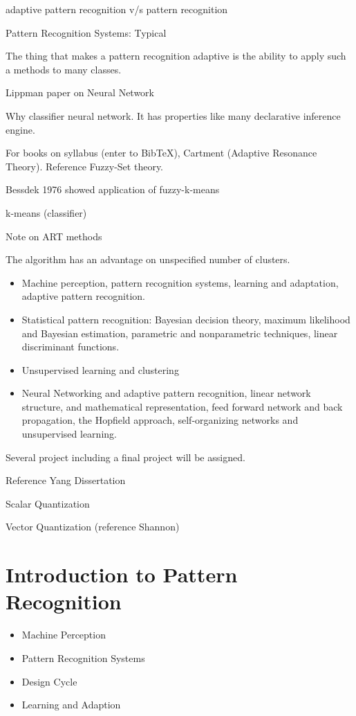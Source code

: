 adaptive pattern recognition
v/s 
pattern recognition

Pattern Recognition Systems:  Typical


The thing that makes a pattern recognition adaptive is the ability to apply such a methods to many classes.  

Lippman paper on Neural Network 

Why classifier neural network.  It has properties like many declarative inference engine.  

For books on syllabus (enter to BibTeX), Cartment  (Adaptive Resonance Theory).  Reference Fuzzy-Set theory.  


Bessdek 1976 showed application of fuzzy-k-means 


k-means (classifier)

Note on ART methods 

The algorithm has an advantage on unspecified number of clusters.  

\begin{itemize}
	\item Machine perception, pattern recognition systems, learning and adaptation, adaptive pattern recognition.
	\item Statistical pattern recognition: Bayesian decision theory, maximum likelihood and Bayesian estimation, parametric and nonparametric techniques, linear discriminant functions.  
	\item Unsupervised learning and clustering
	\item Neural Networking and adaptive pattern recognition, linear network structure, and mathematical representation, feed forward network and back propagation, the Hopfield approach, self-organizing networks and unsupervised learning.  
\end{itemize}

Several project including a final project will be assigned. 


Reference Yang Dissertation 


Scalar Quantization

Vector Quantization (reference Shannon)



\section{Introduction to Pattern Recognition}
\begin{itemize}
	\item Machine Perception
	\item Pattern Recognition Systems
	\item Design Cycle
	\item Learning and Adaption
\end{itemize}


